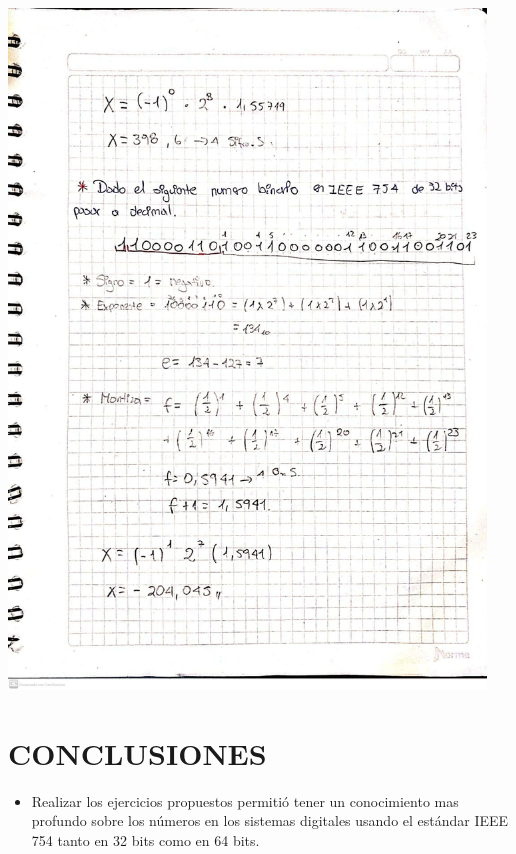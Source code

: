 \documentclass[12pt]{article}
\begin{document}
\begin{minipage}{0.95\textwidth}
    \raggedleft
    \includegraphics[width=0.95\textwidth]{inFiles/Figures/ej7.jpeg}
\end{minipage}

\vspace{3cm}


\section*{CONCLUSIONES}
\begin{itemize}
    \item {Realizar los ejercicios propuestos permitió tener un conocimiento mas profundo sobre los números en los sistemas 
    digitales usando el estándar IEEE 754 tanto en 32 bits como en 64 bits.}
\end{itemize}


\vspace{0.5cm}
\end{document}
